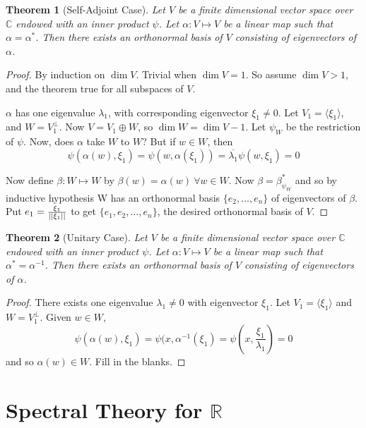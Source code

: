 \documentclass{notes}
\theoremstyle{plain}
\newtheorem{theorem}{Theorem}[chapter]
\begin{document}
\begin{theorem}[Self-Adjoint Case]
  Let $V$ be a finite dimensional vector space over $\mathbb{C}$
  endowed with an inner product $\psi$.  Let $\alpha : V \mapsto V$ be
  a linear map such that $\alpha = \alpha^*$.  Then there exists an
  orthonormal basis of $V$ consisting of eigenvectors of $\alpha$.
\end{theorem}

\begin{proof}
  By induction on $\dim V$.  Trivial when $\dim V = 1$.  So assume
  $\dim V > 1$, and the theorem true for all subspaces of $V$.
  
  $\alpha$ has one eigenvalue $\lambda_1$, with corresponding
  eigenvector $\xi_1 \ne 0$.  Let $V_1 = \langle \xi_1 \rangle$, and
  $W = V_1^{\perp}$.  Now $V=V_1 \oplus W$, so $\dim W = \dim V - 1$.
  Let $\psi_W$ be the restriction of $\psi$.  Now, does $\alpha$ take
  $W$ to $W$?  But if $w \in W$, then
\[
\psi(\alpha(w),\xi_1) = \psi(w,\alpha(\xi_1)) =
\overline{\lambda_1}\psi(w,\xi_1)= 0
\]

Now define $\beta : W \mapsto W$ by $\beta(w) = \alpha(w) \: \forall w
\in W$.  Now $\beta = \beta_{\psi_W}^*$ and so by inductive hypothesis
W has an orthonormal basis $\{e_2, \dots, e_n \}$ of eigenvectors of
$\beta$.  Put $e_1 = \frac{\xi_1}{\left|\left|\xi_1\right|\right|}$ to get
$\{e_1,e_2, \dots, e_n\}$, the desired orthonormal basis of $V$.
\end{proof}

\begin{theorem}[Unitary Case]
  Let $V$ be a finite dimensional vector space over $\mathbb{C}$
  endowed with an inner product $\psi$.  Let $\alpha : V \mapsto V$ be
  a linear map such that $\alpha^* = \alpha^{-1}$.  Then there exists
  an orthonormal basis of $V$ consisting of eigenvectors of $\alpha$.
\end{theorem}

\begin{proof}
  There exists one eigenvalue $\lambda_1 \ne 0$ with eigenvector
  $\xi_1$.  Let $V_1 = \langle \xi_1 \rangle$ and $W = V_1^{\perp}$.
  Given $w \in W$,
\[
\psi(\alpha(w),\xi_1) = \psi(x,\alpha^{-1}(\xi_1) =
\psi(x,\frac{\xi_1}{\lambda_1}) = 0
\]
and so $\alpha(w) \in W$.  Fill in the blanks.
\end{proof}

\section{Spectral Theory for $\mathbb{R}$}
\end{document}
